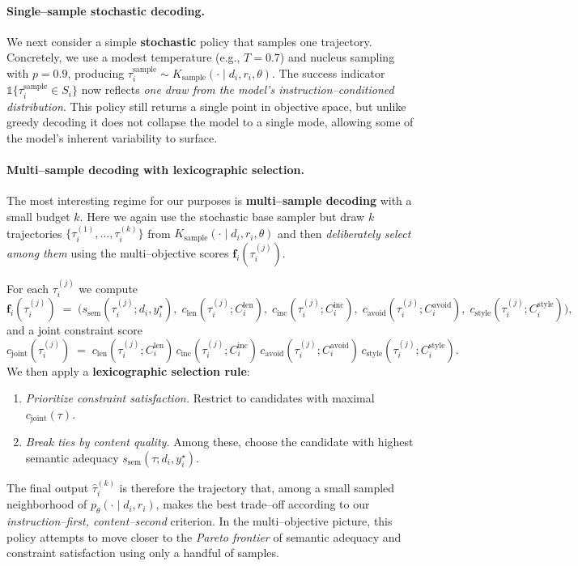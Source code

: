 \paragraph{Single--sample stochastic decoding.}
We next consider a simple \textbf{stochastic} policy that samples one
trajectory. Concretely, we use a modest temperature (e.g., $T{=}0.7$)
and nucleus sampling with $p{=}0.9$, producing
$\tau_i^{\text{sample}} \sim K_{\text{sample}}(\cdot \mid d_i, r_i,
\theta)$. The success indicator
$\mathbb{1}\{\tau_i^{\text{sample}} \in S_i\}$ now reflects \emph{one
draw from the model's instruction--conditioned distribution}. This
policy still returns a single point in objective space, but unlike
greedy decoding it does not collapse the model to a single mode,
allowing some of the model's inherent variability to surface.

\paragraph{Multi--sample decoding with lexicographic selection.}
The most interesting regime for our purposes is \textbf{multi--sample
decoding} with a small budget $k$. Here we again use the stochastic base
sampler but draw $k$ trajectories
$\{\tau_i^{(1)}, \dots, \tau_i^{(k)}\}$ from
$K_{\text{sample}}(\cdot \mid d_i, r_i, \theta)$ and then
\emph{deliberately select among them} using the multi--objective scores
$\mathbf{f}_i(\tau_i^{(j)})$.

For each $\tau_i^{(j)}$ we compute
\[
  \mathbf{f}_i(\tau_i^{(j)})
  \;=\;
  \bigl(
    s_{\text{sem}}(\tau_i^{(j)}; d_i, y_i^\star),\;
    c_{\text{len}}(\tau_i^{(j)}; C^{\text{len}}_i),\;
    c_{\text{inc}}(\tau_i^{(j)}; C^{\text{inc}}_i),\;
    c_{\text{avoid}}(\tau_i^{(j)}; C^{\text{avoid}}_i),\;
    c_{\text{style}}(\tau_i^{(j)}; C^{\text{style}}_i)
  \bigr),
\]
and a joint constraint score
\[
  c_{\text{joint}}(\tau_i^{(j)})
  \;=\;
  c_{\text{len}}(\tau_i^{(j)}; C^{\text{len}}_i)\,
  c_{\text{inc}}(\tau_i^{(j)}; C^{\text{inc}}_i)\,
  c_{\text{avoid}}(\tau_i^{(j)}; C^{\text{avoid}}_i)\,
  c_{\text{style}}(\tau_i^{(j)}; C^{\text{style}}_i).
\]
We then apply a \textbf{lexicographic selection rule}:
\begin{enumerate}[leftmargin=1.5em,noitemsep]
  \item \emph{Prioritize constraint satisfaction.}
        Restrict to candidates with maximal $c_{\text{joint}}(\tau)$.
  \item \emph{Break ties by content quality.}
        Among these, choose the candidate with highest semantic adequacy
        $s_{\text{sem}}(\tau; d_i, y_i^\star)$.
\end{enumerate}
The final output $\hat{\tau}_i^{(k)}$ is therefore the trajectory that,
among a small sampled neighborhood of $p_\theta(\cdot \mid d_i, r_i)$,
makes the best trade--off according to our
\emph{instruction--first, content--second} criterion. In the
multi--objective picture, this policy attempts to move closer to the
\emph{Pareto frontier} of semantic adequacy and constraint satisfaction
using only a handful of samples.


